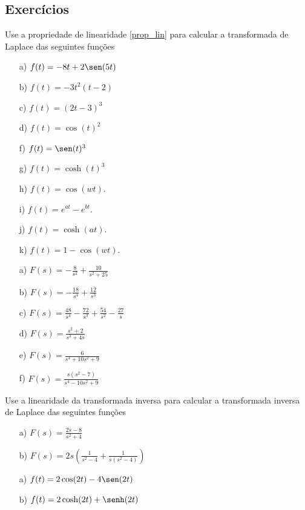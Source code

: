\subsection*{Exercícios}
\begin{exer} Use a propriedade de linearidade \ref{prop_lin} para calcular a transformada de Laplace das seguintes funções
 \begin{itemize}
  \item[a)] $f(t)=-8t+2\sen(5t)$
  \item[b)] $f(t)=-3t^2(t-2)$
  \item[c)] $f(t)=(2t-3)^3$
  \item[d)] $f(t)=\cos(t)^2$
  \item[f)] $f(t)=\sen(t)^3$
  \item[g)] $f(t)=\cosh(t)^3$
 \item[h)] $f(t)=\cos(wt)$.
 \item[i)] $f(t)=e^{at}-e^{bt}$.
 \item[j)] $f(t)=\cosh(at)$.
 \item[k)] $f(t)=1-\cos(wt)$.
  \end{itemize}
 \end{exer}
\begin{resp}
 \begin{itemize}
  \item[a)] $F(s)=-\frac{8}{s^2}+\frac{10}{s^2+25}$
  \item[b)] $F(s)=-\frac{18}{s^4}+\frac{12}{s^3}$
  \item[c)] $F(s)=\frac{48}{s^4}-\frac{72}{s^3}+\frac{54}{s^2}-\frac{27}{s}$
  \item[d)] $F(s)=\frac{s^2+2}{s^3+4s}$
  \item[e)] $F(s)=\frac{6}{s^4+10s^2+9}$
  \item[f)] $F(s)=\frac{s(s^2-7)}{s^4-10s^2+9}$
 \end{itemize}
\end{resp}
\begin{exer} Use a linearidade da transformada inversa para calcular a transformada inversa de Laplace das seguintes funções
 \begin{itemize}
  \item[a)] $F(s)=\frac{2s-8}{s^2+4}$
  \item[b)] $F(s)=2s\left(\frac{1}{s^2-4}+\frac{1}{s(s^2-4)}\right)$
 \end{itemize}
 \end{exer}
\begin{resp}
 \begin{itemize}
  \item[a)] $f(t)=2\cos(2t)-4\sen(2t)$
  \item[b)] $f(t)=2\cosh(2t)+\senh(2t)$
 \end{itemize}
\end{resp}
